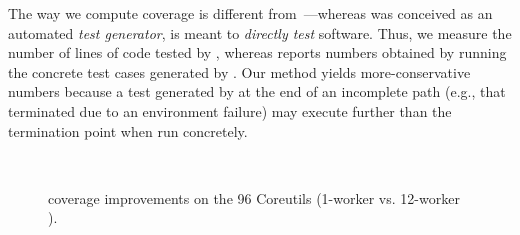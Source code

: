 The way we compute coverage is different from~\cite{klee}---whereas \klee was conceived as an automated {\em test generator}, \cnine is meant to {\em directly test} software. Thus, we measure the number of lines of code tested by \cnine, whereas \cite{klee} reports numbers obtained by running the concrete test cases generated by \klee.  Our method yields more-conservative numbers because a test generated by \klee at the end of an incomplete path (e.g., that terminated due to an environment failure) may execute further than the termination point when run concretely.

\begin{figure}[h!]
  \centering
  \label{fig:coreutils-final-cov} \\
  \label{fig:coreutils-delta-cov}
  \caption{\cnine coverage improvements on the 96 Coreutils (1-worker \cnine vs. 12-worker \cnine).}
  \label{fig:coreutils-cov}
\end{figure}


